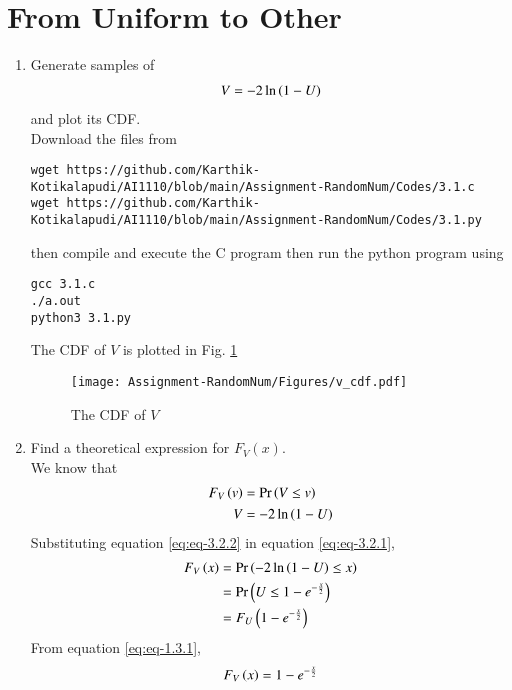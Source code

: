 \documentclass[journal,12pt,twocolumn]{IEEEtran}
\renewcommand\thesection{\arabic{section}}
\begin{document}
\section{From Uniform to Other}
\begin{enumerate}[label=\thesection.\arabic*
,ref=\thesection.\theenumi]
\item
Generate samples of 
%
\begin{align}
V = -2\ln\left(1-U\right)
\end{align}
%
and plot its CDF.\\
\solution
Download the files from
\begin{lstlisting}
wget https://github.com/Karthik-Kotikalapudi/AI1110/blob/main/Assignment-RandomNum/Codes/3.1.c
wget https://github.com/Karthik-Kotikalapudi/AI1110/blob/main/Assignment-RandomNum/Codes/3.1.py
\end{lstlisting}
then compile and execute the  C program then run the python program using
\begin{lstlisting}
gcc 3.1.c
./a.out
python3 3.1.py
\end{lstlisting}
The CDF of $V$ is plotted in Fig. \ref{fig:v_cdf}
\begin{figure}[ht!]
\centering
\texttt{[image: Assignment-RandomNum/Figures/v\_cdf.pdf]}
\caption{The CDF of $V$}
\label{fig:v_cdf}
\end{figure}

\item Find a theoretical expression for $F_V(x)$.\\
\solution
We know that
\begin{align}
	F_V\left(v\right) &= \Pr\left(V\le v\right)
	\label{eq:eq-3.2.1}
	\\
	V &= -2\ln\left(1-U\right)
	\label{eq:eq-3.2.2}
\end{align}
Substituting equation \eqref{eq:eq-3.2.2} in equation \eqref{eq:eq-3.2.1},
\begin{align}
	F_V\left(x\right) &= \Pr\left(-2\ln\left(1-U\right)\le x\right)
	\\
	&= \Pr\left(U\le 1-e^{-\frac{x}{2}}\right)
	\\
	&= F_U\left(1-e^{-\frac{x}{2}}\right)
\end{align}
From equation \eqref{eq:eq-1.3.1}, 
\begin{align}
	F_V\left(x\right) = 1- e^{-\frac{x}{2}}
\end{align}

\end{enumerate}
\end{document}
